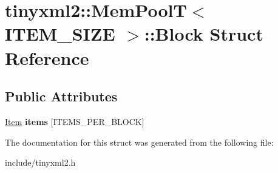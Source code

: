 \hypertarget{structtinyxml2_1_1MemPoolT_1_1Block}{}\section{tinyxml2\+::Mem\+PoolT$<$ I\+T\+E\+M\+\_\+\+S\+I\+ZE $>$\+::Block Struct Reference}
\label{structtinyxml2_1_1MemPoolT_1_1Block}
\subsection*{Public Attributes}
\begin{DoxyCompactItemize}
\item 
\mbox{\label{structtinyxml2_1_1MemPoolT_1_1Block_a4f2589e877b60f26313e107433e550f7}} 
\mbox{\hyperlink{uniontinyxml2_1_1MemPoolT_1_1Item}{Item}} {\bfseries items} \mbox{[}I\+T\+E\+M\+S\+\_\+\+P\+E\+R\+\_\+\+B\+L\+O\+CK\mbox{]}
\end{DoxyCompactItemize}


The documentation for this struct was generated from the following file\+:\begin{DoxyCompactItemize}
\item 
include/tinyxml2.\+h\end{DoxyCompactItemize}
